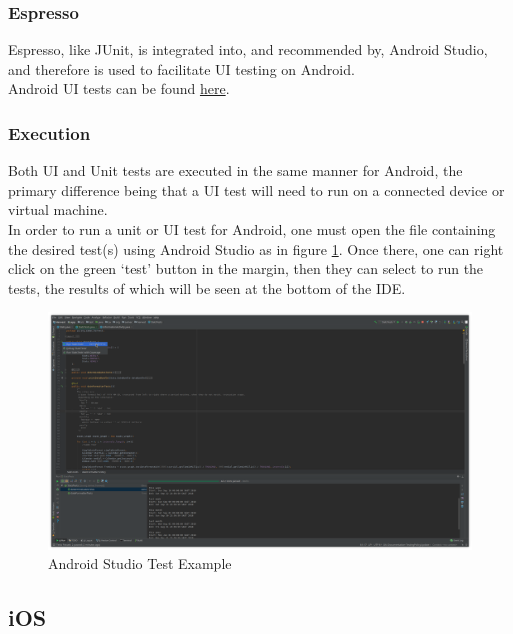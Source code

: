 \documentclass[12pt]{article}
\begin{document}
 \subsubsection{Espresso}
 Espresso, like JUnit, is integrated into, and recommended by, Android Studio, and therefore is used to facilitate UI testing on Android.\\
 \indent Android UI tests can be found \href{https://github.com/BinaryNinjaz/COS301-Capstone/tree/master/Source/Android/Harvest/app/src/androidTest/java/za/org/samac/harvest}{here}.
  
 \subsubsection{Execution}
 Both UI and Unit tests are executed in the same manner for Android, the primary difference being that a UI test will need to run on a connected device or virtual machine.\\
\indent In order to run a unit or UI test for Android, one must open the file containing the desired test(s) using Android Studio as in figure \ref{fig:android-test}. Once there, one can right click on the green `test' button in the margin, then they can select to run the tests, the results of which will be seen at the bottom of the IDE.
   \begin{center}
  \begin{figure}
	\label{fig:android-test}
  	\includegraphics[width=\textwidth]{images/Android-JUnit-tests.png}
	\caption{Android Studio Test Example}
  \end{figure}
\end{center}

\subsection{iOS}
\end{document}
